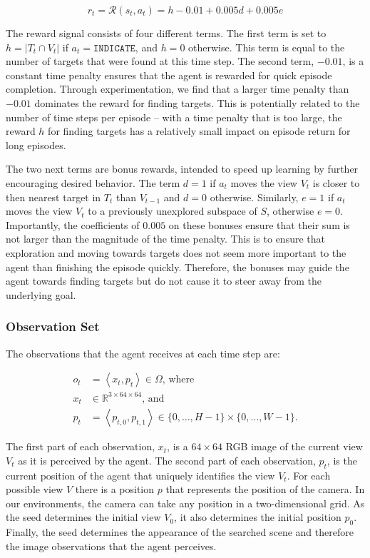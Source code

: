 \begin{equation}
    r_t = \mathcal{R}(s_t, a_t) = h - 0.01 + 0.005d + 0.005e
\end{equation}

The reward signal consists of four different terms.
The first term is set to \(h = \left\lvert T_t \cap V_t \right\rvert\) if \(a_t = \mathtt{INDICATE}\), and \(h = 0\) otherwise.
This term is equal to the number of targets that were found at this time step.
The second term, \(-0.01\), is a constant time penalty ensures that the agent is rewarded for quick episode completion.
Through experimentation, we find that a larger time penalty than \(-0.01\) dominates the reward for finding targets.
This is potentially related to the number of time steps per episode -- with a time penalty that is too large, the reward \(h\) for finding targets has a relatively small impact on episode return for long episodes.

The two next terms are bonus rewards, intended to speed up learning by further encouraging desired behavior.
The term \(d = 1\) if \(a_t\) moves the view \(V_t\) is closer to then nearest target in \(T_t\) than \(V_{t-1}\) and \(d = 0\) otherwise.
Similarly, \(e = 1\) if \(a_t\) moves the view \(V_t\) to a previously unexplored subspace of \(S\), otherwise \(e = 0\).
Importantly, the coefficients of \(0.005\) on these bonuses ensure that their sum is not larger than the magnitude of the time penalty.
This is to ensure that exploration and moving towards targets does not seem more important to the agent than finishing the episode quickly.
Therefore, the bonuses may guide the agent towards finding targets but do not cause it to steer away from the underlying goal.

\subsubsection{Observation Set}

The observations that the agent receives at each time step are:

\begin{align}
    o_t & = \left\langle x_t, p_t \right\rangle \in \Omega \text{, where} \\
    x_t & \in \mathbb{R}^{3 \times 64 \times 64} \text{, and} \\
    p_t & = \left\langle p_{t,0}, p_{t,1} \right\rangle \in \{0, \dots, H-1\} \times \{0, \dots, W-1\}.
\end{align}

The first part of each observation, \(x_t\), is a \(64 \times 64\) RGB image of the current view \(V_t\) as it is perceived by the agent.
The second part of each observation, \(p_t\), is the current position of the agent that uniquely identifies the view \(V_t\).
For each possible view \(V\) there is a position \(p\) that represents the position of the camera.
In our environments, the camera can take any position in a two-dimensional grid.
As the seed determines the initial view \(V_0\), it also determines the initial position \(p_0\).
Finally, the seed determines the appearance of the searched scene and therefore the image observations that the agent perceives.


